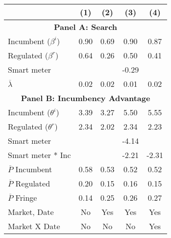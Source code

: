 \begin{tabular}{@{\extracolsep{15pt}}lcccc}
\toprule\n& (1) &(2) & (3)  & (4) \\
\midrule
\multicolumn{5}{c}{\textbf{Panel A: Search}} \\[1ex]
Incumbent ($\beta^i$) 
 & 
0.90
 & 
0.69
 & 
0.90
 & 
0.87
 \\
Regulated ($\beta^r$) 
 & 
0.64
 & 
0.26
 & 
0.50
 & 
0.41
 \\
Smart meter 
 & 

 & 

 & 
-0.29
 & 

 \\
\midrule
$\overline{\lambda}$ 
 & 
0.02
 & 
0.02
 & 
0.01
 & 
0.02
 \\
\midrule \multicolumn{5}{c}{\textbf{Panel B: Incumbency Advantage}} \\[1ex]
Incumbent ($\theta^i$) 
 & 
3.39
 & 
3.27
 & 
5.50
 & 
5.55
 \\
Regulated ($\theta^r$) 
 & 
2.34
 & 
2.02
 & 
2.34
 & 
2.23
 \\
Smart meter 
 & 

 & 

 & 
-4.14
 & 

 \\
Smart meter * Inc 
 & 

 & 

 & 
-2.21
 & 
-2.31
 \\
\midrule
$\overline{P}$ Incumbent 
 & 
0.58
 & 
0.53
 & 
0.52
 & 
0.52
 \\
$\overline{P}$  Regulated 
 & 
0.20
 & 
0.15
 & 
0.16
 & 
0.15
 \\
$\overline{P}$  Fringe 
 & 
0.14
 & 
0.25
 & 
0.26
 & 
0.27
 \\
\midrule
Market, Date & No & Yes & Yes & Yes\\
Market X Date & No & No & No & Yes \\
\bottomrule
\end{tabular}
